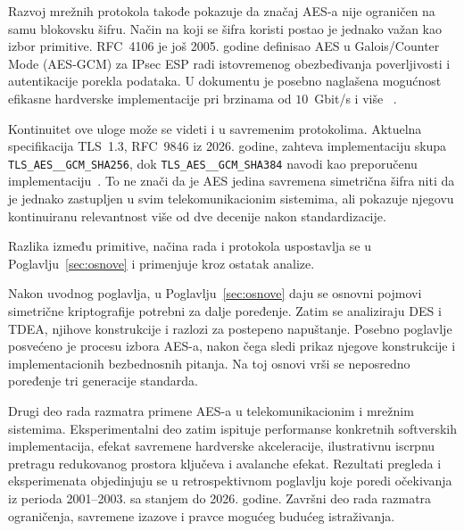 Razvoj mrežnih protokola takođe pokazuje da značaj AES-a nije ograničen
na samu blokovsku šifru. Način na koji se šifra koristi postao je
jednako važan kao izbor primitive. RFC~4106 je još 2005. godine
definisao AES u Galois/Counter Mode (AES-GCM) za IPsec ESP radi
istovremenog obezbeđivanja poverljivosti i autentikacije porekla
podataka. U dokumentu je posebno naglašena mogućnost efikasne
hardverske implementacije pri brzinama od $10$~Gbit/s i više
~\cite{rfc4106}.

Kontinuitet ove uloge može se videti i u savremenim protokolima.
Aktuelna specifikacija TLS~1.3, RFC~9846 iz 2026. godine, zahteva
implementaciju skupa \texttt{TLS\_\allowbreak AES\_\_\allowbreak GCM\_\allowbreak SHA256}, dok
\texttt{TLS\_\allowbreak AES\_\_\allowbreak GCM\_\allowbreak SHA384} navodi kao preporučenu
implementaciju~\cite{rfc9846}. To ne znači da je AES jedina savremena
simetrična šifra niti da je jednako zastupljen u svim
telekomunikacionim sistemima, ali pokazuje njegovu kontinuiranu
relevantnost više od dve decenije nakon standardizacije.

Razlika između primitive, načina rada i protokola uspostavlja se u
Poglavlju~\ref{sec:osnove} i primenjuje kroz ostatak analize.

Nakon uvodnog poglavlja, u Poglavlju~\ref{sec:osnove} daju se osnovni
pojmovi simetrične kriptografije potrebni za dalje poređenje.
Zatim se analiziraju DES i TDEA, njihove konstrukcije i razlozi
za postepeno napuštanje. Posebno poglavlje posvećeno je procesu izbora
AES-a, nakon čega sledi prikaz njegove konstrukcije i implementacionih
bezbednosnih pitanja. Na toj osnovi vrši se neposredno poređenje tri
generacije standarda.

Drugi deo rada razmatra primene AES-a u telekomunikacionim i mrežnim
sistemima. Eksperimentalni deo zatim ispituje performanse konkretnih
softverskih implementacija, efekat savremene hardverske akceleracije,
ilustrativnu iscrpnu pretragu redukovanog prostora ključeva i
avalanche efekat. Rezultati pregleda i eksperimenata objedinjuju se u
retrospektivnom poglavlju koje poredi očekivanja iz perioda
2001--2003. sa stanjem do 2026. godine. Završni deo rada razmatra
ograničenja, savremene izazove i pravce mogućeg budućeg istraživanja.
